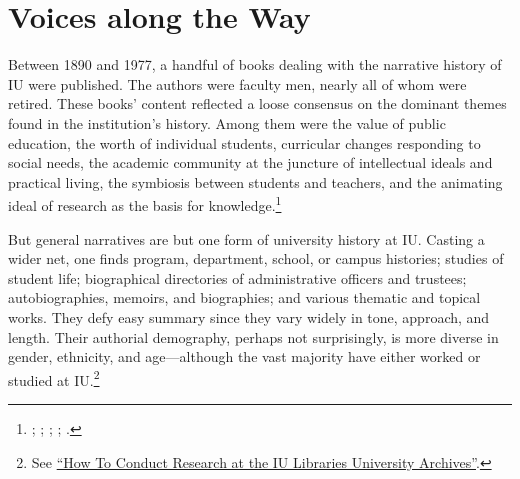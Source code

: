 \documentclass[
  american,
  letterpaper,
]{scrreprt}
\begin{document}
\section*{Voices along the Way}\label{voices-along-the-way}


Between 1890 and 1977, a handful of books dealing with the narrative
history of IU were published. The authors were faculty men, nearly all
of whom were retired. These books' content reflected a loose consensus
on the dominant themes found in the institution's history. Among them
were the value of public education, the worth of individual students,
curricular changes responding to social needs, the academic community at
the juncture of intellectual ideals and practical living, the symbiosis
between students and teachers, and the animating ideal of research as
the basis for knowledge.\footnote{;
  ; ;
  ; .}

But general narratives are but one form of university history at IU.
Casting a wider net, one finds program, department, school, or campus
histories; studies of student life; biographical directories of
administrative officers and trustees; autobiographies, memoirs, and
biographies; and various thematic and topical works. They defy easy
summary since they vary widely in tone, approach, and length. Their
authorial demography, perhaps not surprisingly, is more diverse in
gender, ethnicity, and age---although the vast majority have either
worked or studied at IU.\footnote{See
  \href{https://guides.libraries.indiana.edu/iuarchives_howto}{``How To
  Conduct Research at the IU Libraries University Archives''}.}
\end{document}
